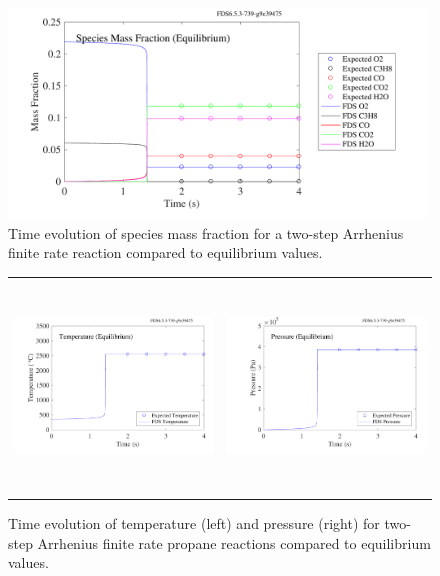 \documentclass[11pt]{book}
\begin{document}
\begin{figure}[h!]
\centering
\includegraphics[height=2.2in]{SCRIPT_FIGURES/reactionrate_equilibrium_species}
\caption[Species evolution in an equilibrium case]{Time evolution of species mass fraction for a two-step Arrhenius finite rate reaction compared to equilibrium values.}
\label{fig:Arrhenius_2Order_1stepb}
\end{figure}

\begin{figure}[ht]
\begin{tabular*}{\textwidth}{lr}
\includegraphics[height=2.2in]{SCRIPT_FIGURES/reactionrate_equilibrium_temperature} &
\includegraphics[height=2.2in]{SCRIPT_FIGURES/reactionrate_equilibrium_pressure}
\end{tabular*}
\caption[Temperature and pressure evolution for equilibrium case]{Time evolution of temperature (left) and pressure (right) for two-step Arrhenius finite rate propane reactions compared to equilibrium values.}
\label{fig:Arrhenius_175Order_23stepb}
\end{figure}
\end{document}
